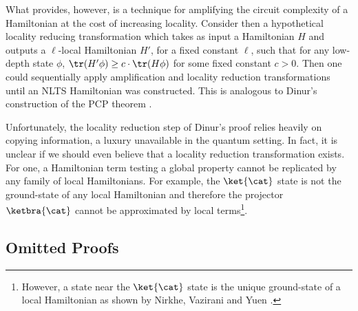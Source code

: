 \documentclass{toc}
\begin{document}
What  provides, however, is a technique for amplifying the circuit complexity of a Hamiltonian at the cost of increasing locality. Consider then a hypothetical locality reducing transformation which takes as input a Hamiltonian $H$ and outputs a $\ell$-local Hamiltonian $H'$, for a fixed constant $\ell$, such that for  any low-depth state $\phi$, $\tr(H' \phi) \geq c \cdot \tr(H \phi)$ for some fixed constant $c > 0$. Then one could sequentially apply amplification and locality reduction transformations until an NLTS Hamiltonian was constructed. This is analogous to Dinur's construction of the PCP theorem \cite{dinur-pcp}. 

Unfortunately, the locality reduction step of Dinur's proof relies heavily on copying information, a luxury unavailable in the quantum setting. In fact, it is unclear if we should even believe that a locality reduction transformation exists. For one, a Hamiltonian term testing a global property cannot be replicated by any family of local Hamiltonians. For example, the $\ket{\cat}$ state is not the ground-state of any local Hamiltonian and therefore the projector $\ketbra{\cat}$ cannot be approximated by local terms\footnote{However, a state near the $\ket{\cat}$ state is the unique ground-state of a local Hamiltonian as shown by Nirkhe, Vazirani and Yuen \cite{nirkhe_et_al:LIPIcs:2018:9095} .}.



\subsection{Omitted Proofs}
\end{document}
